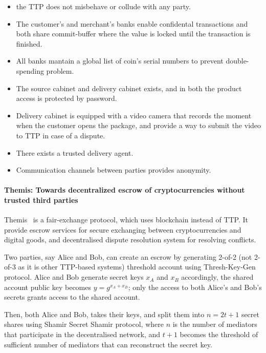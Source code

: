 \documentclass{ieeeaccess}
\begin{document}
\begin{itemize}
    \item the TTP does not misbehave or collude with any party. 
    \item The customer's and merchant's banks enable confidental transactions and both share commit-buffer where the value is locked until the transaction is finished.   
    \item All banks mantain a global list of coin's serial numbers to prevent double-spending problem. 
    \item The source cabinet and delivery cabinet exists, and in both the product access is protected by password.
    \item Delivery cabinet is equipped with a video camera that records the moment when the customer opens the package, and provide a way to submit the video to TTP in case of a dispute. 
    \item There exists a trusted delivery agent.
    \item Communication channels between parties provides anonymity.
\end{itemize}

\paragraph{Themis: Towards decentralized escrow of cryptocurrencies
without trusted third
parties}\label{themis-towards-decentralized-escrow-of-cryptocurrencies-without-trusted-third-parties}

Themis~\cite{meng2019themis} is a fair-exchange
protocol, which uses blockchain instead of TTP. It provide escrow
services for secure exchanging between cryptocurrencies and digital goods, and decentralised dispute resolution system for resolving conflicts.

Two parties, say Alice and Bob, can create an escrow by generating
2-of-2 (not 2-of-3 as it is other TTP-based systems) threshold account
using Thresh-Key-Gen protocol. Alice and Bob generate secret keys
\(x_A\) and \(x_B\) accordingly, the shared account public key becomes
\(y = g^{x_A+x_B}\); only the access to both Alice's and Bob's secrets
grants access to the shared account.

Then, both Alice and Bob, takes their keys, and split them into
\(n=2t+1\) secret shares using Shamir Secret Shamir protocol, where
\(n\) is the number of mediators that participate in the decentralised
network, and \(t+1\) becomes the threshold of sufficient number of
mediators that can reconstruct the secret key.
\end{document}
